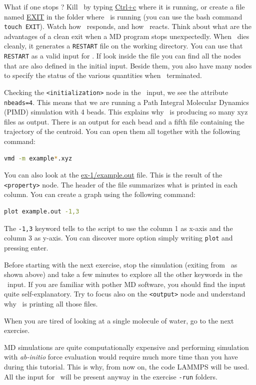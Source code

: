 \documentclass{article}
\begin{document}
\begin{Exercise}[label={i-pi},title={PIMD: a client/server approach}]
\Question
What if one stops \ipi ?  Kill \ipi\ by typing \url{Ctrl+c}
where it is running, or create a file named \url{EXIT} in the folder
where \ipi\ is running (you can use the bash command \texttt{touch
  EXIT}).  Watch how \ipi\ responds, and how \pwx\ reacts.  Think
about what are the advantages of a clean exit when a MD program stops
unexpectedly. When \ipi\ dies cleanly, it generates a \texttt{RESTART}
file on the working directory. You can use that \texttt{RESTART} as a
valid input for \ipi. If look inside the file you can find all the
nodes that are also defined in the initial input. Beside them, you
also have many nodes to specify the status of the various quantities
when \ipi\ terminated.


\Question
Checking the \texttt{<initialization>} node in the \ipi\ input, we see
the attribute \texttt{nbeads=4}. This means that we are running a Path
Integral Molecular Dynamics (PIMD) simulation with 4 beads.
This explains why \ipi\ is producing so many xyz files as output. There
is an output for each bead and a fifth file containing the trajectory
of the centroid. You can open them all together with the following
command:
\begin{lstlisting}[language=bash]
vmd -m example*.xyz
\end{lstlisting}
You can also look at the \url{ex-1/example.out} file. This is the
result of the \texttt{<property>} node. The header of the file
summarizes what is printed in each column. You can create a graph using
the following command:
\begin{lstlisting}[language=bash]
plot example.out -1,3
\end{lstlisting}
The \texttt{-1,3} keyword tells to the script to use the column 1 as
x-axis and the column 3 as y-axis. You can discover more option simply
writing \texttt{plot} and pressing enter.
\end{Exercise}
\vspace{1em}

Before starting with the next exercise, stop the simulation (exiting
from \ipi\ as shown above) and  take a few minutes to explore
all the other keywords in the \ipi\ input. If you are familiar with
pother MD software, you should find the input quite self-explanatory.
Try to focus also on the \texttt{<output>} node and understand why
\ipi\ is printing all those files.


When you are tired of looking at a single molecule of water, go to the
next exercise.

MD simulations are quite computationally expensive and performing
simulation with \emph{ab-initio} force evaluation would require much
more time than you have during this tutorial. This is why,
from now on, the code LAMMPS will be used. All the
input for \qe\ will be present anyway in the exercise \texttt{-run} folders.
\end{document}
